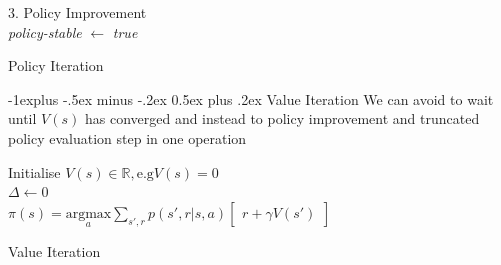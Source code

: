 \documentclass[10pt,landscape]{article}
\makeatletter
\renewcommand{\subsection}{\@startsection{subsection}{2}{0mm}%
                                {-1explus -.5ex minus -.2ex}%
                                {0.5ex plus .2ex}%
                                {\normalfont\normalsize\bfseries}}
\makeatother
\begin{document}
\begin{multicols}{3}
\begin{algorithm}[H]
{ }
 3. Policy Improvement \\
 \emph{policy-stable} $ \leftarrow $ \emph{true} \\
\caption{Policy Iteration}
\end{algorithm}

\subsection{Value Iteration}
We can avoid to wait until $V(s)$ has converged and instead to policy improvement and truncated policy evaluation step in one operation
\begin{algorithm}[H]
 Initialise $V(s) \in \mathbb{R}, \text{e.g} V(s) = 0$ \\
 $\Delta \leftarrow 0$ \\
  $\pi(s) = \text{argmax}\limits_a \sum\limits_{s', r} p(s',r | s, a) \begin{bmatrix}
  		r + \gamma V(s')
  	\end{bmatrix}$
\caption{Value Iteration}
\end{algorithm}

\end{multicols}
\end{document}
